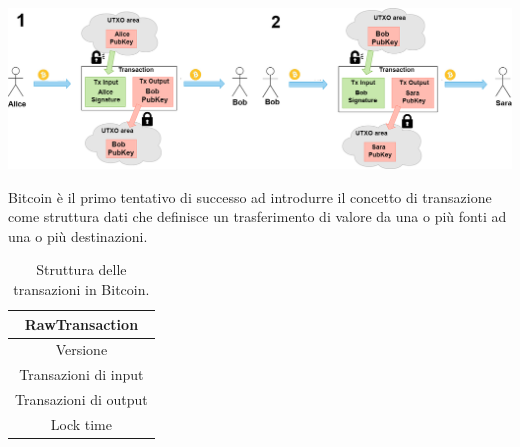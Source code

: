 \begin{example}
{\centering
\vspace{5pt}
\includegraphics[scale=0.2]{images/DiagramUnlocLockUTXO.png}
\vspace{10pt}
\par}

\end{example}

Bitcoin è il primo tentativo di successo ad introdurre il concetto di transazione come struttura dati che definisce un trasferimento di valore da una o più fonti ad una o più destinazioni.

\begin{table}[H]
       \centering\small
           \begin{tabular}{|c|}
               \hline
               \textbf{RawTransaction}\\
               \hline \hline
               Versione   \\
               \hline
               Transazioni di input \\
               \hline
               Transazioni di output \\
               \hline
               Lock time \\
               \hline
       \end{tabular}
       \caption{Struttura delle transazioni in Bitcoin.\label{tab:rawtransactionbitcoin}}
   \end{table}

